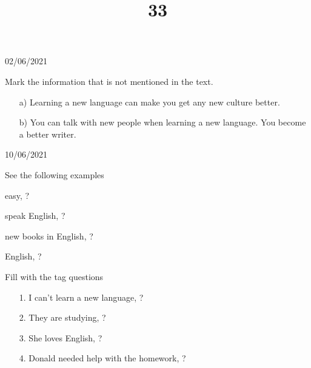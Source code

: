 \documentclass{SchoolBook}
\begin{document}
\begin{day}{02/06/2021}
\begin{enumerate}
            \itemc[2.] Mark the information that is not mentioned in the text. \normalfont
            \begin{enumerate}[nosep]
                \item[a)] Learning a new language can make you get any new culture better.
                \item[b)] You can talk with new people when learning a new language.
                 You become a better writer.
            \end{enumerate}
        \end{enumerate}
    \end{day}
    
    \begin{day}{10/06/2021}
        \title{3}{See the following examples}
        
          easy,  ?
        
          speak English,  ?
        
         new books in English, ?
        
          English,  ?
        
        \title{3}{Fill with the tag questions}
        
        \begin{enumerate}
            \item[1.] I can't learn a new language, ?
            \item[2.] They are studying, ?
            \item[3.] She loves English, ?
            \item[4.] Donald needed help with the homework, ?
        \end{enumerate}
        
            

\end{day}
\end{document}
